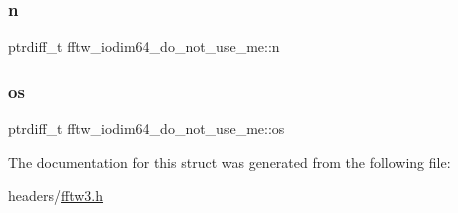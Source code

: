 \subsubsection{\texorpdfstring{n}{n}}
{\footnotesize\ttfamily ptrdiff\+\_\+t fftw\+\_\+iodim64\+\_\+do\+\_\+not\+\_\+use\+\_\+me\+::n}

\mbox{\label{structfftw__iodim64__do__not__use__me_a44118d774124bdaa670f640537b151cf}} 
\subsubsection{\texorpdfstring{os}{os}}
{\footnotesize\ttfamily ptrdiff\+\_\+t fftw\+\_\+iodim64\+\_\+do\+\_\+not\+\_\+use\+\_\+me\+::os}



The documentation for this struct was generated from the following file\+:\begin{DoxyCompactItemize}
\item 
headers/\hyperlink{fftw3_8h}{fftw3.\+h}\end{DoxyCompactItemize}
